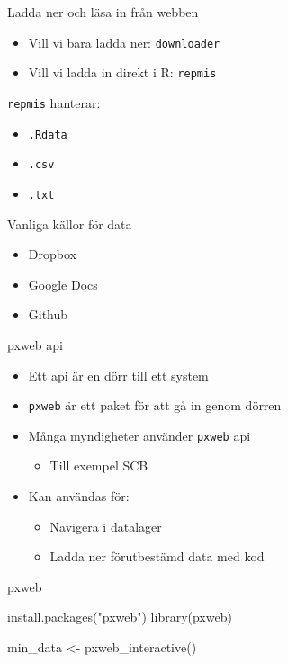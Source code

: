 \documentclass[
  11pt,
  ignorenonframetext,
  handout]{beamer}
\newenvironment{Shaded}{\begin{snugshade}}{\end{snugshade}}
\newcommand{\FunctionTok}[1]{\textcolor[rgb]{0.00,0.00,0.00}{#1}}
\newcommand{\NormalTok}[1]{#1}
\newcommand{\OtherTok}[1]{\textcolor[rgb]{0.56,0.35,0.01}{#1}}
\newcommand{\StringTok}[1]{\textcolor[rgb]{0.31,0.60,0.02}{#1}}
\providecommand{\tightlist}{%
  \setlength{\itemsep}{0pt}\setlength{\parskip}{0pt}}
\begin{document}
\begin{frame}{Ladda ner och läsa in från webben}
\protect\hypertarget{ladda-ner-och-luxe4sa-in-fruxe5n-webben}{}
\begin{itemize}
\tightlist
\item
  Vill vi bara ladda ner: \texttt{downloader}
\item
  Vill vi ladda in direkt i R: \texttt{repmis}
\end{itemize}

\texttt{repmis} hanterar:

\begin{itemize}
\tightlist
\item
  \texttt{.Rdata}
\item
  \texttt{.csv}
\item
  \texttt{.txt}
\end{itemize}
\end{frame}

\begin{frame}{Vanliga källor för data}
\protect\hypertarget{vanliga-kuxe4llor-fuxf6r-data}{}
\begin{itemize}
\tightlist
\item
  Dropbox
\item
  Google Docs
\item
  Github
\end{itemize}
\end{frame}

\begin{frame}{pxweb api}
\protect\hypertarget{pxweb-api}{}
\begin{itemize}
\tightlist
\item
  Ett api är en dörr till ett system
\item
  \texttt{pxweb} är ett paket för att gå in genom dörren
\item
  Många myndigheter använder \texttt{pxweb} api

  \begin{itemize}
  \tightlist
  \item
    Till exempel SCB
  \end{itemize}
\item
  Kan användas för:

  \begin{itemize}
  \tightlist
  \item
    Navigera i datalager
  \item
    Ladda ner förutbestämd data med kod
  \end{itemize}
\end{itemize}
\end{frame}

\begin{frame}[fragile]{pxweb}
\protect\hypertarget{pxweb}{}
\begin{Shaded}
\begin{Highlighting}[]
\FunctionTok{install.packages}\NormalTok{(}\StringTok{"pxweb"}\NormalTok{)}
\FunctionTok{library}\NormalTok{(pxweb)}

\NormalTok{min\_data }\OtherTok{\textless{}{-}} \FunctionTok{pxweb\_interactive}\NormalTok{()}
\end{Highlighting}
\end{Shaded}
\end{frame}
\end{document}
